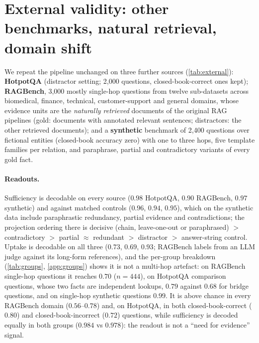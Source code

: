 \section{External validity: other benchmarks, natural retrieval, domain shift}
\label{sec:external}

We repeat the pipeline unchanged on three further sources (\cref{tab:external}): \textbf{HotpotQA} (distractor setting; 2{,}000 questions, closed-book-correct ones kept); \textbf{RAGBench}, 3{,}000 mostly single-hop questions from twelve sub-datasets across biomedical, finance, technical, customer-support and general domains, whose evidence units are the \emph{naturally retrieved} documents of the original RAG pipelines (gold: documents with annotated relevant sentences; distractors: the other retrieved documents); and a \textbf{synthetic} benchmark of 2{,}400 questions over fictional entities (closed-book accuracy zero) with one to three hops, five template families per relation, and paraphrase, partial and contradictory variants of every gold fact.

\begin{table}[t]
\centering\scriptsize
\setlength{\tabcolsep}{2.5pt}

\caption{External validity (Qwen2.5-7B): within-dataset probes on the row's split, MuSiQue 2-hop directions applied without retraining, and the patching and projection-out tests of \cref{sec:causal} (answered rate, 150 held-out questions).}
\label{tab:external}
\end{table}

\paragraph{Readouts.}
Sufficiency is decodable on every source ($0.98$ HotpotQA, $0.90$ RAGBench, $0.97$ synthetic) and against matched controls ($0.96$, $0.94$, $0.95$), which on the synthetic data include paraphrastic redundancy, partial evidence and contradictions; the projection ordering there is decisive (chain, leave-one-out or paraphrased) $>$ contradictory $>$ partial $\approx$ redundant $>$ distractor $>$ answer-string control. Uptake is decodable on all three ($0.73$, $0.69$, $0.93$; RAGBench labels from an LLM judge against its long-form references), and the per-group breakdown (\cref{tab:groups}, \cref{app:groups}) shows it is not a multi-hop artefact: on RAGBench single-hop questions it reaches $0.70$ ($n{=}444$), on HotpotQA comparison questions, whose two facts are independent lookups, $0.79$ against $0.68$ for bridge questions, and on single-hop synthetic questions $0.99$. It is above chance in every RAGBench domain ($0.56$--$0.78$) and, on HotpotQA, in both closed-book-correct ($0.80$) and closed-book-incorrect ($0.72$) questions, while sufficiency is decoded equally in both groups ($0.984$ vs $0.978$): the readout is not a ``need for evidence'' signal.


